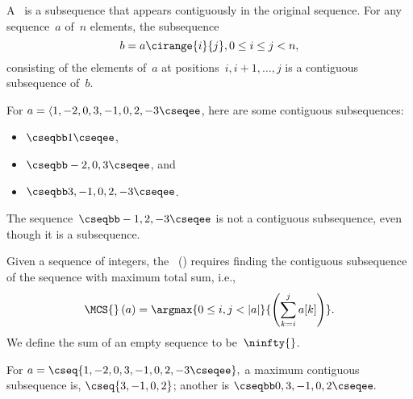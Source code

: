 \begin{flex}
\begin{definition}
\label{def:mcss::introduction::consubseq}
A~ is a subsequence that appears
contiguously in the original sequence.
%
For any sequence~$a$ of~$n$ elements, the subsequence
%
\[
b =  a\cirange{i}{j}, 0 \le i \le j < n,
\]
%
consisting of the elements of~$a$ at positions~$i, i+1, \ldots, j$ is
a contiguous subsequence of~$b$.
\end{definition}
%

\begin{example}
For $a = \langle 1, -2, 0, 3, -1, 0, 2, -3 \cseqee$, here are some
contiguous subsequences:
\begin{itemize}
\item 
$\cseqbb 1 \cseqee$,

\item
$\cseqbb -2, 0, 3 \cseqee$, and

\item
$\cseqbb 3, -1,  0, 2, -3 \cseqee$.

\end{itemize}

The sequence~$\cseqbb -1,2,-3 \cseqee$ is not a contiguous subsequence,
even though it is a subsequence.

\end{example}
\end{flex}

\begin{flex}

\begin{definition}
\label{def:mcss::introduction::mcs-problem}

Given a sequence of integers, 
%
the~ (\MCS{}) requires finding the contiguous subsequence of the sequence with maximum total sum, i.e.,
%
\begin{eqnarray*}
    \MCS{}\,(a) = \argmax{0 \leq i,j < |a|}{\left( \sum_{k=i}^j a[k]  \right)}.
\end{eqnarray*}
%
We define the sum of an empty sequence to be~$\ninfty{}$.
%
\end{definition}

\begin{example}
For 
%
$a = \cseq{1, -2, 0, 3, -1, 0, 2, -3 \cseqee},$ 
%
a maximum contiguous subsequence is, 
%
$\cseq{3, -1, 0, 2}$;
%
another is 
%
$\cseqbb 0, 3, -1, 0, 2 \cseqee.$
%
\end{example}
\end{flex}

